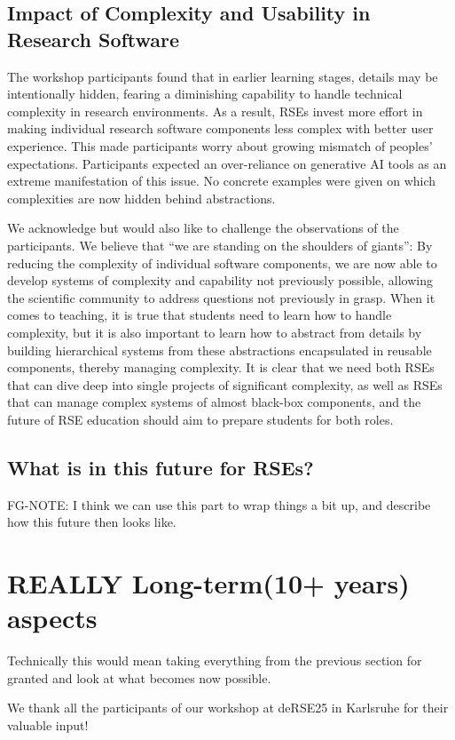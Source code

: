 \documentclass{eceasst}
\begin{document}
\subsection{Impact of Complexity and Usability in Research Software}

The workshop participants found that in earlier learning stages,
details may be intentionally hidden,
fearing a diminishing capability to handle technical complexity in research environments.
As a result, RSEs invest more effort in making individual research software components
less complex with better user experience.
This made participants worry about growing mismatch of peoples' expectations.
Participants expected an over-reliance on generative AI tools as an extreme manifestation of this issue.
No concrete examples were given on which complexities are now hidden behind abstractions.

We acknowledge but would also like to challenge the observations of the participants.
We believe that ``we are standing on the shoulders of giants'':
By reducing the complexity of individual software components,
we are now able to develop systems of complexity and capability not previously possible,
allowing the scientific community to address questions not previously in grasp.
When it comes to teaching, it is true that students need to learn how to handle complexity,
but it is also important to learn how to abstract from details
by building hierarchical systems from these abstractions encapsulated in reusable components, thereby managing complexity.
It is clear that we need both RSEs that can dive deep into single projects of significant complexity,
as well as RSEs that can manage complex systems of almost black-box components,
and the future of RSE education should aim to prepare students for both roles.


\subsection{What is in this future for RSEs?}
FG-NOTE: I think we can use this part to wrap things a bit up, and describe how this future then looks like.


\section{REALLY Long-term(10+ years) aspects}
Technically this would mean taking everything from the previous section for granted and look
at what becomes now possible.

\begin{acknowledge}
We thank all the participants of our workshop at deRSE25 in Karlsruhe for their valuable input!
\end{acknowledge}



\end{document}
